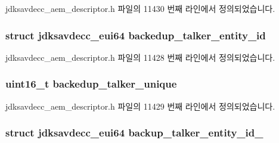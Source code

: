jdksavdecc\+\_\+aem\+\_\+descriptor.\+h 파일의 11430 번째 라인에서 정의되었습니다.

\subsubsection[{\texorpdfstring{backedup\+\_\+talker\+\_\+entity\+\_\+id}{backedup_talker_entity_id}}]{\setlength{\rightskip}{0pt plus 5cm}struct {\bf jdksavdecc\+\_\+eui64} backedup\+\_\+talker\+\_\+entity\+\_\+id}\hypertarget{structjdksavdecc__descriptor__stream_a218e3249603c8b6c32ed14bbbb1e0b30}{}\label{structjdksavdecc__descriptor__stream_a218e3249603c8b6c32ed14bbbb1e0b30}


jdksavdecc\+\_\+aem\+\_\+descriptor.\+h 파일의 11428 번째 라인에서 정의되었습니다.

\subsubsection[{\texorpdfstring{backedup\+\_\+talker\+\_\+unique}{backedup_talker_unique}}]{\setlength{\rightskip}{0pt plus 5cm}uint16\+\_\+t backedup\+\_\+talker\+\_\+unique}\hypertarget{structjdksavdecc__descriptor__stream_a771e4d5f3cd01acbe4a885e46a888722}{}\label{structjdksavdecc__descriptor__stream_a771e4d5f3cd01acbe4a885e46a888722}


jdksavdecc\+\_\+aem\+\_\+descriptor.\+h 파일의 11429 번째 라인에서 정의되었습니다.

\subsubsection[{\texorpdfstring{backup\+\_\+talker\+\_\+entity\+\_\+id\+\_\+0}{backup_talker_entity_id_0}}]{\setlength{\rightskip}{0pt plus 5cm}struct {\bf jdksavdecc\+\_\+eui64} backup\+\_\+talker\+\_\+entity\+\_\+id\+\_}\hypertarget{structjdksavdecc__descriptor__stream_a6d81901ba67de7a8dd9891bdec2d6bb0}{}\label{structjdksavdecc__descriptor__stream_a6d81901ba67de7a8dd9891bdec2d6bb0}


